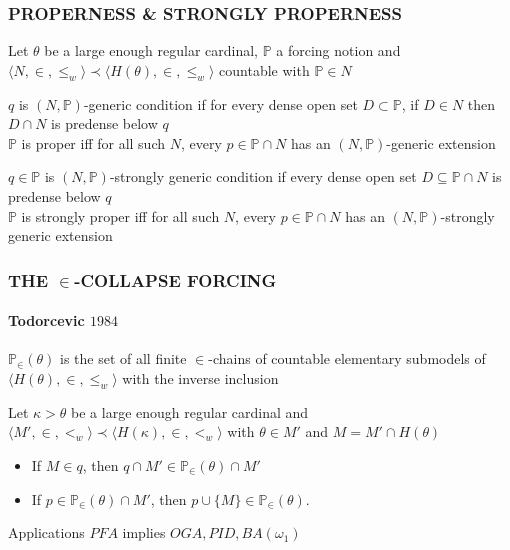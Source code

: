 \documentclass[10pt]{beamer}
\begin{document}
\begin{frame}
\frametitle{PROPERNESS \& STRONGLY PROPERNESS}
Let $\theta$ be a large enough regular cardinal, $\mathbb{P}$ a forcing notion and $\langle N, \in, \leq_w \rangle \prec \langle H(\theta), \in, \leq_w \rangle $ countable with $\mathbb{P} \in N $
\begin{block}{}
$q$ is $(N, \mathbb{P})$-generic condition if for every dense open set $D \subset \mathbb{P}$, if $D \in N$ then $D \cap N$ is predense below $q$\\
$\mathbb{P}$ is proper iff for all such $N$, every $p \in \mathbb{P} \cap N$ has an $(N, \mathbb{P})$-generic extension
\end{block}
\begin{block}{}
$q \in \mathbb{P}$ is $(N, \mathbb{P})$-strongly generic condition if every dense open set $D \subseteq \mathbb{P} \cap N$ is predense below $q$\\
$\mathbb{P}$ is strongly proper iff for all such $N$, every $p \in \mathbb{P} \cap N$ has an $(N, \mathbb{P})$-strongly generic extension
\end{block}
\end{frame}
\begin{frame}
\frametitle{THE $\in$-COLLAPSE FORCING}
\framesubtitle{Todorcevic $1984$}
\vspace{-2mm}
\begin{block}{}
$\mathbb{P}_{\in}(\theta)$ is the set of all finite $\in$-chains of countable elementary submodels of $\langle H(\theta), \in, \leq_w \rangle $ with the inverse inclusion
\end{block}

Let $\kappa > \theta$ be a large enough regular cardinal and $\langle M', \in, <_w \rangle \prec \langle H(\kappa), \in, <_w \rangle$ with $\theta \in M'$ and $M=M' \cap H(\theta)$
\begin{itemize}
\item If $M \in q$, then $q \cap M' \in \mathbb{P}_{\in}(\theta) \cap M'$
\item If $p \in \mathbb{P}_{\in}(\theta) \cap M'$, then	$p \cup \{M\} \in \mathbb{P}_{\in}(\theta)$.
\end{itemize}
\begin{block}{Applications}
 $PFA$ implies $OGA, PID, BA(\omega_1)$
\end{block}
\end{frame}
\end{document}
